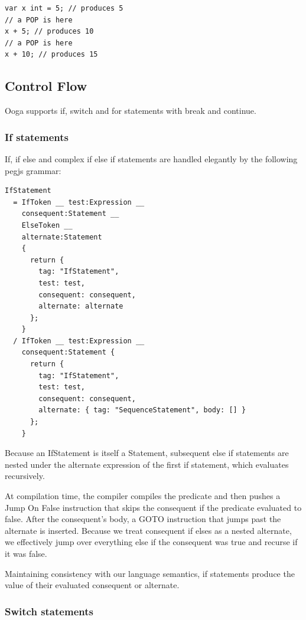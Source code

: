 \documentclass{report}
\begin{document}
\begin{verbatim}
var x int = 5; // produces 5
// a POP is here
x + 5; // produces 10
// a POP is here
x + 10; // produces 15
\end{verbatim}

\subsection{Control Flow}

Ooga supports if, switch and for statements with break and continue.

\subsubsection{If statements}

If, if else and complex if else if statements are handled elegantly by the following pegjs grammar:

\begin{verbatim}
IfStatement
  = IfToken __ test:Expression __
    consequent:Statement __
    ElseToken __
    alternate:Statement
    {
      return {
        tag: "IfStatement",
        test: test,
        consequent: consequent,
        alternate: alternate
      };
    }
  / IfToken __ test:Expression __
    consequent:Statement {
      return {
        tag: "IfStatement",
        test: test,
        consequent: consequent,
        alternate: { tag: "SequenceStatement", body: [] }
      };
    }
\end{verbatim}

Because an IfStatement is itself a Statement, subsequent else if statements are nested under the alternate expression of the first if statement, which evaluates recursively.

At compilation time, the compiler compiles the predicate and then pushes a Jump On False instruction that skips the consequent if the predicate evaluated to false. After the consequent's body, a GOTO instruction that jumps past the alternate is inserted. Because we treat consequent if elses as a nested alternate, we effectively jump over everything else if the consequent was true and recurse if it was false.

Maintaining consistency with our language semantics, if statements produce the value of their evaluated consequent or alternate.

\subsubsection{Switch statements}
\end{document}

